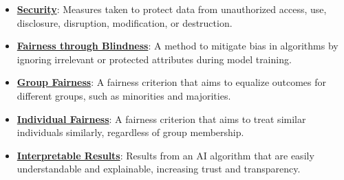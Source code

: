 \documentclass{article}%
\begin{document}
\begin{itemize}[leftmargin=*]
\item \href{https://purdue.brightspace.com/d2l/common/assets/pdfjs-d2l-dist/1.0.14-legacy/web/viewer.html?file=%2Fcontent%2Fenforced%2F1095467-wl.202510.CS.24300.001%2F16L2-ethics.pdf%3Fou%3D1095467&lang=en-us&container=d2l-fileviewer-rendered-pdf&fullscreen=d2l-fileviewer-rendered-pdf-dialog&height=667#page=11}{\textbf{Security}}: Measures taken to protect data from unauthorized access, use, disclosure, disruption, modification, or destruction.%
\item \href{https://purdue.brightspace.com/d2l/common/assets/pdfjs-d2l-dist/1.0.14-legacy/web/viewer.html?file=%2Fcontent%2Fenforced%2F1095467-wl.202510.CS.24300.001%2F16L2-ethics.pdf%3Fou%3D1095467&lang=en-us&container=d2l-fileviewer-rendered-pdf&fullscreen=d2l-fileviewer-rendered-pdf-dialog&height=667#page=25}{\textbf{Fairness through Blindness}}: A method to mitigate bias in algorithms by ignoring irrelevant or protected attributes during model training.%
\item \href{https://purdue.brightspace.com/d2l/common/assets/pdfjs-d2l-dist/1.0.14-legacy/web/viewer.html?file=%2Fcontent%2Fenforced%2F1095467-wl.202510.CS.24300.001%2F16L2-ethics.pdf%3Fou%3D1095467&lang=en-us&container=d2l-fileviewer-rendered-pdf&fullscreen=d2l-fileviewer-rendered-pdf-dialog&height=667#page=26}{\textbf{Group Fairness}}: A fairness criterion that aims to equalize outcomes for different groups, such as minorities and majorities.%
\item \href{https://purdue.brightspace.com/d2l/common/assets/pdfjs-d2l-dist/1.0.14-legacy/web/viewer.html?file=%2Fcontent%2Fenforced%2F1095467-wl.202510.CS.24300.001%2F16L2-ethics.pdf%3Fou%3D1095467&lang=en-us&container=d2l-fileviewer-rendered-pdf&fullscreen=d2l-fileviewer-rendered-pdf-dialog&height=667#page=27}{\textbf{Individual Fairness}}: A fairness criterion that aims to treat similar individuals similarly, regardless of group membership.%
\item \href{https://purdue.brightspace.com/d2l/common/assets/pdfjs-d2l-dist/1.0.14-legacy/web/viewer.html?file=%2Fcontent%2Fenforced%2F1095467-wl.202510.CS.24300.001%2F16L2-ethics.pdf%3Fou%3D1095467&lang=en-us&container=d2l-fileviewer-rendered-pdf&fullscreen=d2l-fileviewer-rendered-pdf-dialog&height=667#page=28}{\textbf{Interpretable Results}}: Results from an AI algorithm that are easily understandable and explainable, increasing trust and transparency.%
\end{itemize}

%
\end{document}
